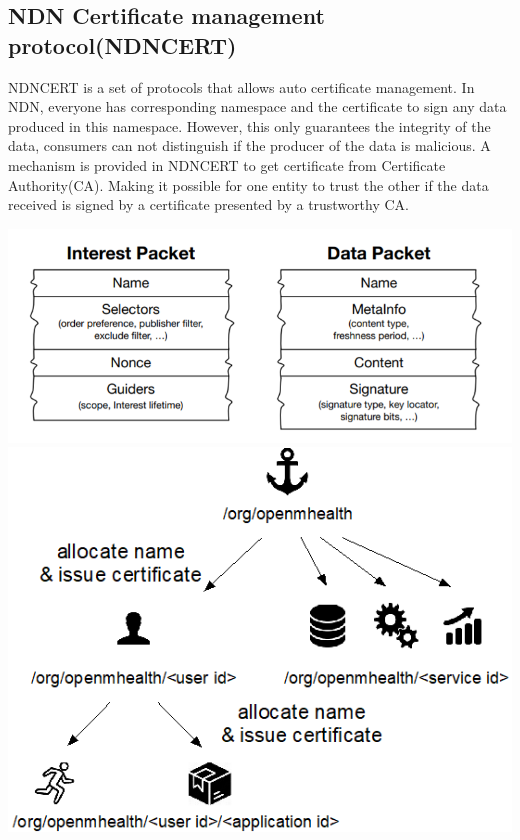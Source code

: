 \documentclass[a0,portrait]{poster}
\begin{document}
\begin{multicols}{2}
\subsection*{NDN Certificate management protocol(NDNCERT)\cite{zhang2017ndncert}}
\par
	NDNCERT is a set of protocols that allows auto certificate management.
	In NDN, everyone has corresponding namespace and the certificate to sign any data produced in this namespace.
	However, this only guarantees the integrity of the data, consumers can not distinguish if the producer of the data is malicious.
	A mechanism is provided in NDNCERT to get certificate from Certificate Authority(CA).
	Making it possible for one entity to trust the other if the data received is signed by a certificate presented by a trustworthy CA.
\par
\begin{minipage}[b]{0.55\linewidth}
	\includegraphics[width=\linewidth]{figures/packet.png}
	\includegraphics[width=\linewidth]{figures/NDNfit.png}

\end{minipage}
\end{multicols}
\end{document}
